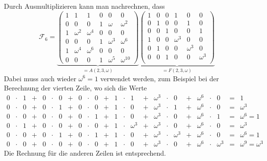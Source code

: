Durch Ausmultiplizieren kann man nachrechnen, dass
\[
\mathcal{F}_6
=
\underbrace{
\left(\begin{array}{ccc|ccc}
1&       1&       1&      0&       0&          0\\
0&       0&       0&      1&\omega  &   \omega^2\\
\hline
1&\omega^2&\omega^4&      0&       0&          0\\
0&       0&       0&      1&\omega^3&   \omega^6\\
\hline
1&\omega^4&\omega^6&      0&       0&          0\\
0&       0&       0&      1&\omega^5&\omega^{10}
\end{array}\right)
}_{\displaystyle =A(2,3,\omega)}
\underbrace{
\left(\begin{array}{ccc|ccc}
1&0&0&       1&       0&       0\\
0&1&0&       0&       1&       0\\
0&0&1&       0&       0&       1\\
\hline
1&0&0&\omega^3&       0&       0\\
0&1&0&       0&\omega^3&       0\\
0&0&1&       0&       0&\omega^3\\
\end{array}\right)
}_{\displaystyle =F(2,3,\omega)}
\]
Dabei muss auch wieder $\omega^6=1$ verwendet werden, zum Beispiel
bei der Berechnung der vierten Zeile, wo sich die Werte
\[
\renewcommand\arraycolsep{2pt}
\begin{array}{rclcrclcrclcrclcrclcrclcl}
0&\cdot&1 &+& 0&\cdot&0 &+& 0&\cdot&0 &+& 1&\cdot&1 &+& \omega^3&\cdot&0 &+& \omega^6&\cdot&0 &=& 1 \\
0&\cdot&0 &+& 0&\cdot&1 &+& 0&\cdot&0 &+& 1&\cdot&0 &+& \omega^3&\cdot&1 &+& \omega^6&\cdot&0 &=& \omega^3 \\
0&\cdot&0 &+& 0&\cdot&0 &+& 0&\cdot&1 &+& 1&\cdot&0 &+& \omega^3&\cdot&0 &+& \omega^6&\cdot&1 &=& \omega^6 = 1 \\
0&\cdot&1 &+& 0&\cdot&0 &+& 0&\cdot&0 &+& 1&\cdot&\omega^3 &+& \omega^3&\cdot&0 &+& \omega^6&\cdot&0 &=& \omega^3 \\
0&\cdot&0 &+& 0&\cdot&1 &+& 0&\cdot&1 &+& 1&\cdot&0 &+& \omega^3&\cdot&\omega^3 &+& \omega^6&\cdot&0 &=& \omega^6=1 \\
0&\cdot&0 &+& 0&\cdot&0 &+& 0&\cdot&0 &+& 1&\cdot&0 &+& \omega^3&\cdot&0 &+& \omega^6&\cdot&\omega^3 &=& \omega^9=\omega^3 
\end{array}
\]
Die Rechnung für die anderen Zeilen ist entsprechend.

